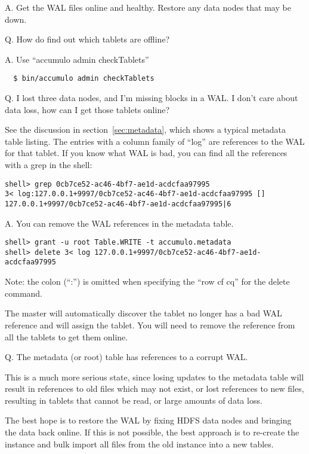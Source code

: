 A. Get the WAL files online and healthy.  Restore any data nodes that may be down.

Q. How do find out which tablets are offline?

A. Use ``accumulo admin checkTablets''

\small
\begin{verbatim}
  $ bin/accumulo admin checkTablets
\end{verbatim}
\normalsize

Q. I lost three data nodes, and I'm missing blocks in a WAL.  I don't care about data loss, how
can I get those tablets online?

See the discussion in section~\ref{sec:metadata}, which shows a typical metadata table listing.  
The entries with a column family of ``log'' are references to the WAL for that tablet. 
If you know what WAL is bad, you can find all the references with a grep in the shell:

\small
\begin{verbatim}
shell> grep 0cb7ce52-ac46-4bf7-ae1d-acdcfaa97995
3< log:127.0.0.1+9997/0cb7ce52-ac46-4bf7-ae1d-acdcfaa97995 []    127.0.0.1+9997/0cb7ce52-ac46-4bf7-ae1d-acdcfaa97995|6
\end{verbatim}
\normalsize

A. You can remove the WAL references in the metadata table.

\small
\begin{verbatim}
shell> grant -u root Table.WRITE -t accumulo.metadata
shell> delete 3< log 127.0.0.1+9997/0cb7ce52-ac46-4bf7-ae1d-acdcfaa97995
\end{verbatim}
\normalsize

Note: the colon (``:'') is omitted when specifying the ``row cf cq'' for the delete command.

The master will automatically discover the tablet no longer has a bad WAL reference and will
assign the tablet.  You will need to remove the reference from all the tablets to get them 
online.


Q. The metadata (or root) table has references to a corrupt WAL.

This is a much more serious state, since losing updates to the metadata table will result
in references to old files which may not exist, or lost references to new files, resulting
in tablets that cannot be read, or large amounts of data loss.

The best hope is to restore the WAL by fixing HDFS data nodes and bringing the data back online.
If this is not possible, the best approach is to re-create the instance and bulk import all files from
the old instance into a new tables.

